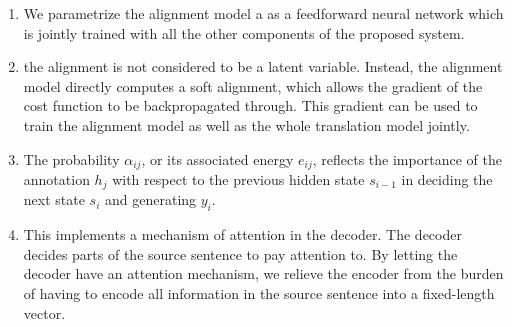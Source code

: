 \begin{enumerate}
    \item  We parametrize the alignment model a as a feedforward neural network which is jointly trained with all the other components of the proposed system.
    \hfill \cite{adv-ml-tech/paper/arxiv.org/1409.0473}

    \item the alignment is not considered to be a latent variable. 
    Instead, the alignment model directly computes a soft alignment, which allows the gradient of the cost function to be backpropagated through. 
    This gradient can be used to train the alignment model as well as the whole translation model jointly.
    \hfill \cite{adv-ml-tech/paper/arxiv.org/1409.0473}

    \item The probability $\alpha_{ij}$, or its associated energy $e_{ij}$, reflects the importance of the annotation $h_j$ with respect to the previous hidden state $s_{i-1}$ in deciding the next state $s_i$ and generating $y_i$.
    \hfill \cite{adv-ml-tech/paper/arxiv.org/1409.0473}

    \item This implements a mechanism of attention in the decoder. 
    The decoder decides parts of the source sentence to pay attention to. 
    By letting the decoder have an attention mechanism, we relieve the encoder from the burden of having to encode all information in the source sentence into a fixed-length vector.
    \hfill \cite{adv-ml-tech/paper/arxiv.org/1409.0473}

    
\end{enumerate}

























